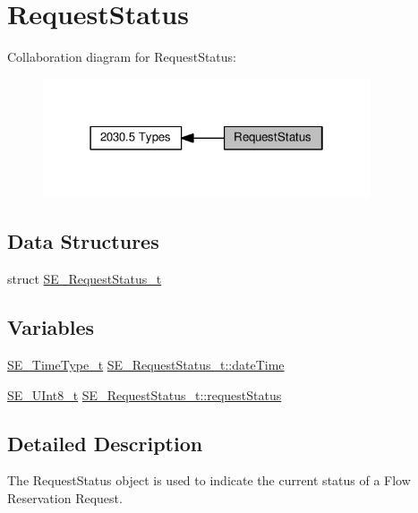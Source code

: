 \hypertarget{group__RequestStatus}{}\section{Request\+Status}
\label{group__RequestStatus}
Collaboration diagram for Request\+Status\+:\nopagebreak
\begin{figure}[H]
\begin{center}
\leavevmode
\includegraphics[width=274pt]{group__RequestStatus}
\end{center}
\end{figure}
\subsection*{Data Structures}
\begin{DoxyCompactItemize}
\item 
struct \hyperlink{structSE__RequestStatus__t}{S\+E\+\_\+\+Request\+Status\+\_\+t}
\end{DoxyCompactItemize}
\subsection*{Variables}
\begin{DoxyCompactItemize}
\item 
\hyperlink{group__TimeType_ga6fba87a5b57829b4ff3f0e7638156682}{S\+E\+\_\+\+Time\+Type\+\_\+t} \hyperlink{group__RequestStatus_ga5a17406904af9612df11590a4fd8b1fe}{S\+E\+\_\+\+Request\+Status\+\_\+t\+::date\+Time}
\item 
\hyperlink{group__UInt8_gaf7c365a1acfe204e3a67c16ed44572f5}{S\+E\+\_\+\+U\+Int8\+\_\+t} \hyperlink{group__RequestStatus_ga5c594ed3fb20fdf8681c8dfd7957c78d}{S\+E\+\_\+\+Request\+Status\+\_\+t\+::request\+Status}
\end{DoxyCompactItemize}


\subsection{Detailed Description}
The Request\+Status object is used to indicate the current status of a Flow Reservation Request. 


